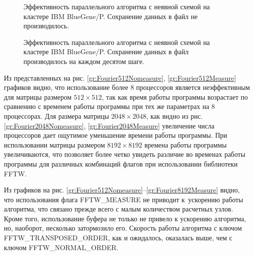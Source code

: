     \begin{figure}[h!]
        \begin{center}
            \begin{minipage}{0.45\linewidth}
                \caption{Эффективность параллельного алгоритма с неявной схемой на кластере IBM BlueGene/P. \mbox{Сохранение} данных в файл не производилось.}
                \label{gr:SweepEfficiencyBluegeneNosave}
            \end{minipage}
            \hfill
            \begin{minipage}{0.45\linewidth}
                \caption{Эффективность параллельного алгоритма с неявной схемой на кластере IBM BlueGene/P. \mbox{Сохранение} данных в файл производилось на каждом десятом шаге.}
                \label{gr:SweepEfficiencyBluegeneSave}
            \end{minipage}
        \end{center}
    \end{figure}

    \newpage


Из представленных на рис. \ref{gr:Fourier512Nomeasure}, \ref{gr:Fourier512Measure} графиков видно, что использование более 8 процессоров является неэффективным для матрицы размером $512\times512$,
так как время работы программы возрастает по сравнению с временем работы программы при тех же параметрах на 8 процессорах.
Для размера матрицы $2048\times2048$, как видно из рис. \ref{gr:Fourier2048Nomeasure}, \ref{gr:Fourier2048Measure} увеличение числа процессоров дает ощутимое уменьшение времени работы программы.
При использовании матрицы размером $8192\times8192$ времена работы программы увеличиваются,
что позволяет более четко увидеть различие во временах работы программы для различных комбинаций флагов при использовании библиотеки FFTW.

Из графиков на рис. \ref{gr:Fourier512Nomeasure}--\ref{gr:Fourier8192Measure} видно,
что использования флага FFTW\_MEASURE не приводит к~ускорению работы алгоритма, что связано прежде всего с малым количеством расчетных узлов.
Кроме того, использование буфера не только не привело к ускорению алгоритма, но, наоборот, несколько затормозило его.
Скорость работы алгоритма с ключом FFTW\_TRANSPOSED\_ORDER, как и ожидалось, оказалась выше, чем с ключом FFTW\_NORMAL\_ORDER.

